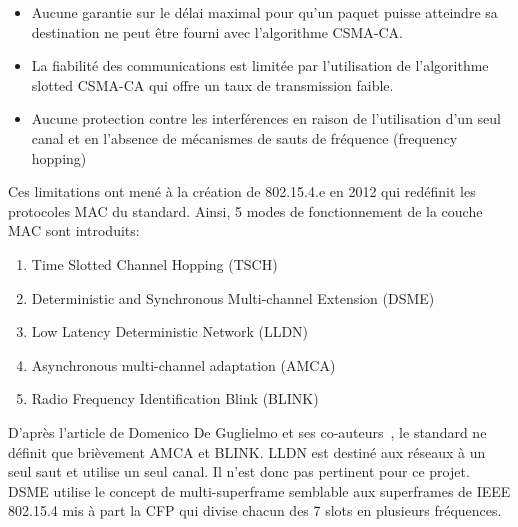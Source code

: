     \begin{itemize}
      \item Aucune garantie sur le délai maximal pour qu'un paquet puisse atteindre sa destination
        ne peut être fourni avec l'algorithme CSMA-CA.
      \item La fiabilité des communications est limitée par l'utilisation de l'algorithme slotted   CSMA-CA qui offre un taux de transmission faible.
      \item Aucune protection contre les interférences en raison de l'utilisation d'un seul canal et en l'absence de mécanismes de sauts de fréquence (frequency hopping)
    \end{itemize}
    \vspace{0.5cm}
    Ces limitations ont mené à la création de 802.15.4.e en 2012 qui redéfinit les protocoles MAC du  standard.
    Ainsi, 5 modes de fonctionnement de la couche MAC sont introduits:
    \begin{enumerate}
      \item Time Slotted Channel Hopping (TSCH)
      \item Deterministic and Synchronous Multi-channel Extension (DSME)
      \item Low Latency Deterministic Network (LLDN)
      \item Asynchronous multi-channel adaptation (AMCA)
      \item Radio Frequency Identification Blink (BLINK)
    \end{enumerate}
    D'après l'article de Domenico De Guglielmo et ses co-auteurs~\cite{paper:802.15.4e-survey}, le standard ne définit que brièvement AMCA et BLINK.
    LLDN est destiné aux réseaux à un seul saut et utilise un seul canal. Il n'est donc pas pertinent pour ce projet. DSME utilise le concept de multi-superframe semblable aux superframes de IEEE 802.15.4 mis à part la CFP qui divise chacun des 7 slots en plusieurs fréquences.


